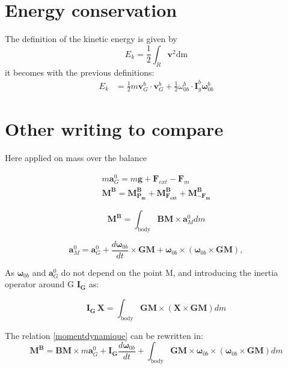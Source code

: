 \documentclass{article}
\begin{document}
\section{Energy conservation}
The definition of the kinetic energy is given by 
\begin{equation} \label{kineticgeneric}
E_k = \frac{1}{2} \int_{R} \textbf{v}^2  \text{dm} 
\end{equation}
it becomes with the previous definitions:
\begin{align} 
E_k &= \frac{1}{2} m \textbf{v}_G^b \cdot \textbf{v}_G^b +  \frac{1}{2}  {\omega}_{0b}^b \cdot \textbf{I}^b_g  \mathbf{\omega}_{0b}^b  
\end{align}


%
\section{Other writing to compare}
Here applied on mass over the balance

\begin{equation}
\begin{array}{l}
\displaystyle m \mathbf{a}^0_G = m \mathbf{g} + \mathbf{F}_{ext} - \mathbf{F}_m \\
\displaystyle \mathbf{M^B} = \mathbf{M^B_{P_m}}+\mathbf{M^B_{F_{ext}}}+ \mathbf{M^B_{-F_{m}}} 
\end{array}
\end{equation}

\begin{equation}\label{momentdynamique}
\mathbf{M^B} = \int_{\text{body}} \mathbf{BM}\times \mathbf{a}^0_M dm 
\end{equation}

\begin{equation} \mathbf{a}^0_M = \mathbf{a}^0_{G} + \frac{d \mathbf{ \omega}_{0b}}{dt}  \times  \mathbf{GM} + \mathbf{ \omega}_{0b} \times ( \mathbf{ \omega}_{0b} \times \mathbf{GM}) ,\end{equation}

As $\mathbf{ \omega}_{0b}$ and  $\mathbf{a}^0_{G}$ do not depend on the point M, and introducing the inertia operator around G $\mathbf{I_G}$ as:

\begin{equation}
\mathbf{I_G} \, \mathbf{X} =  \int_{\text{body}}  \mathbf{GM} \times (\mathbf{X} \times  \mathbf{GM}) dm 
\end{equation}
 
The relation \ref{momentdynamique} can be rewritten in:
 \begin{equation}
 \mathbf{M^B} =\mathbf{BM}\times m \mathbf{a}^0_{G} + \mathbf{I_G} \frac{d \mathbf{ \omega}_{0b}}{dt} +  \int_{\text{body}} \mathbf{GM}\times  \mathbf{ \omega}_{0b} \times (\mathbf{\omega}_{0b} \times \mathbf{GM} ) dm 
\end{equation}
\end{document}
